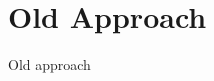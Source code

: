\documentclass[aspectratio=169]{beamer}
\begin{document}



\section{Old Approach}

\begin{frame}
    \begin{center}
        \Huge Old approach
    \end{center}
\end{frame}
\end{document}
